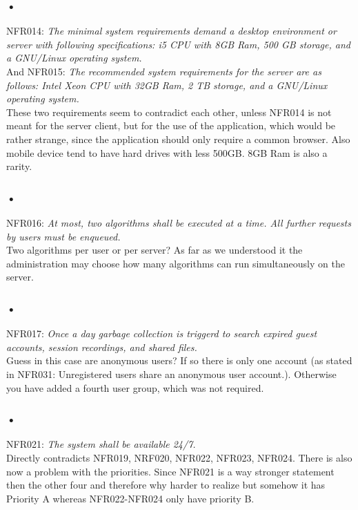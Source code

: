 \documentclass{article}
\begin{document}
\subsubsection{•}
NFR014: \textit{The minimal system requirements demand a desktop environment or server with following specifications: i5 CPU with 8GB Ram, 500 GB storage, and a GNU/Linux operating system.}\\ And
NFR015: \textit{The recommended system requirements for the server are as follows: Intel Xeon CPU with 32GB Ram, 2 TB storage, and a GNU/Linux operating system.}\\
These two requirements seem to contradict each other, unless NFR014 is not meant for the server client, but for the use of the application, which would be rather strange, since the application should only require a common browser. Also mobile device tend to have hard drives with less 500GB. 8GB Ram is also a rarity.

\subsubsection{•}
NFR016: \textit{At most, two algorithms shall be executed at a time. All further requests by users must be enqueued.}\\
Two algorithms per user or per server? As far as we understood it the administration may choose how many algorithms can run simultaneously on the server.

\subsubsection{•}
NFR017: \textit{Once a day garbage collection is triggerd to search expired guest accounts, session recordings, and shared files.}\\
Guess in this case are anonymous users? If so there is only one account (as stated in NFR031: Unregistered users share an anonymous user account.). Otherwise you have added a fourth user group, which was not required.

\subsubsection{•}
NFR021: \textit{The system shall be available 24/7.}\\
Directly contradicts NFR019, NRF020, NFR022, NFR023, NFR024. There is also now a problem with the priorities. Since NFR021 is a way stronger statement then the other four and therefore why harder to realize but somehow it has Priority A whereas NFR022-NFR024 only have priority B.
\end{document}
